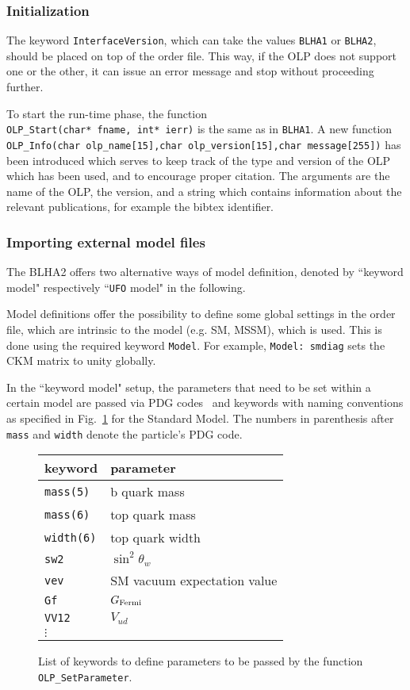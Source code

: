 \subsubsection{Initialization}
The keyword {\tt InterfaceVersion}, which can take the values
{\tt BLHA1} or {\tt BLHA2}, should be placed on top of the order file. 
This way, if the OLP does not support one or the other, it can issue an error message and stop 
without proceeding further.

To start the run-time phase, the function\\
 {\tt OLP\_Start(char* fname, int* ierr)} is the same  as in {\tt BLHA1}.
A new function\\
{\tt \small OLP\_Info(char olp\_name[15],char olp\_version[15],char message[255])} 
has been introduced
which serves to keep track of the type and version of the OLP which has been used,
and to encourage proper citation. 
The arguments are the name of the OLP, the version, and a string which  
contains information about
the relevant publications, for example the bibtex identifier.

\subsubsection{Importing external model files}

The BLHA2 offers two alternative ways of model definition, denoted by 
``keyword model" respectively ``{\tt UFO} model" in the following.

Model definitions offer the possibility to define some global settings 
in the order file, which are intrinsic to the model (e.g. SM, MSSM), which 
is used.
This is done using the required keyword {\tt Model}.
For example, {\tt Model: smdiag} sets the CKM matrix to unity globally.

In the ``keyword model" setup, 
the parameters that need to be set within a certain model 
are passed via PDG codes~\cite{Beringer:1900zz} and keywords 
with naming
conventions as specified in Fig.~\ref{tab:keywords:static} for the Standard
Model. The numbers in parenthesis after {\tt mass} and {\tt width}  denote
the particle's PDG code.

\begin{figure}[htb]
\begin{tabular}{|l|l|}
\hline
keyword & parameter\\
\hline
{\tt mass(5)} & b quark mass \\
{\tt mass(6)} & top quark mass \\
{\tt width(6)} & top quark width\\
{\tt sw2}& $\sin^2\theta_w$\\
{\tt vev}& SM vacuum expectation value\\
{\tt Gf} & $G_{\rm{Fermi}}$\\
{\tt VV12}& $V_{ud}$\\
$\vdots$ & \\
\hline
\end{tabular}
\caption{List of keywords to define parameters to be passed by the function {\tt
OLP\_SetParameter}.}
\label{tab:keywords:static}
\end{figure}

